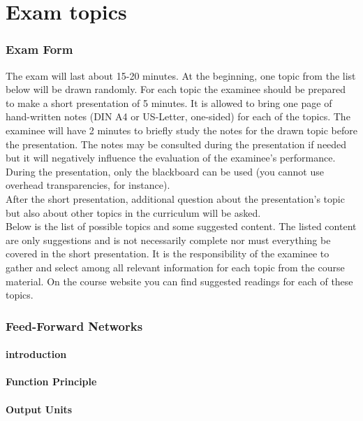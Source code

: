 \documentclass[a4paper,10pt,titlepage]{report}
\begin{document}
\part{Exam topics}

\section{Exam Form}

The exam will last about 15-20 minutes. At the beginning, one topic from the list below will be drawn randomly. For each topic the examinee should be prepared to make a short presentation of 5 minutes. It is allowed to bring one page of hand-written notes (DIN A4 or US-Letter, one-sided) for each of the topics. The examinee will have 2 minutes to briefly study the notes for the drawn topic before the presentation. The notes may be consulted during the presentation if needed but it will negatively influence the evaluation of the examinee's performance. During the presentation, only the blackboard can be used (you cannot use overhead transparencies, for instance).
\\
\vspace{10mm}
After the short presentation, additional question about the presentation's topic but also about other topics in the curriculum will be asked.
\\
\vspace{10mm}
Below is the list of possible topics and some suggested content. The listed content are only suggestions and is not necessarily complete nor must everything be covered in the short presentation. It is the responsibility of the examinee to gather and select among all relevant information for each topic from the course material. On the course website you can find suggested readings for each of these topics.\\
\newpage
\section{Feed-Forward Networks}

\subsection{introduction}

\subsection{Function Principle}
\subsection{Output Units}
\end{document}
